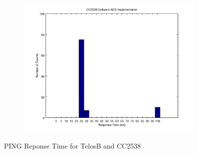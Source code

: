 \begin{figure}[ht!]
\begin{subfigure}{0.4\textwidth}
{		\includegraphics[width=\textwidth]{fig/noncoresec_ping_cc2538_sw.png}
	}
	\end{subfigure}
	\caption{PING Reponse Time for TelosB and CC2538\label{PINGTiming}}
\end{figure}

